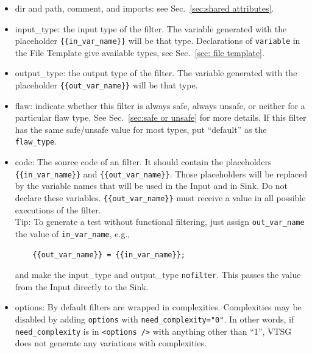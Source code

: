 \documentclass[12pt]{article}
\begin{document}
\begin{itemize}
    \item dir and path, comment, and imports: see Sec.~\ref{sec:shared attributes}.

    \item input\_type: the input type of the filter. The variable 
    generated with
    the placeholder \verb|{{in_var_name}}| will be that type.
    Declarations of \verb|variable| in the File Template give
    available types, see Sec.~\ref{sec: file template}.

    \item output\_type: the output type of the filter.  The variable generated
    with the placeholder \verb|{{out_var_name}}| will be that type.

    \item flaw: indicate whether this filter is always safe, always unsafe, or
      neither for a particular flaw type.  See Sec.~\ref{sec:safe or unsafe} for
      more details.  If this filter has the same safe/unsafe value for most
      types, put ``default'' as the \verb|flaw_type|.

    \item code: The source code of an filter. It should contain the placeholders
    \\
    \verb|{{in_var_name}}| and \verb|{{out_var_name}}|.  Those placeholders will 
    be replaced by the variable names that will be used in the Input and in Sink.  Do
    not declare these variables.
    \verb|{{out_var_name}}| must receive a value in all possible executions of the
    filter.
    \\
    Tip: To generate a test without functional filtering, just assign
    \verb|out_var_name| the value of \verb|in_var_name|, e.g.,
\begin{verbatim}
    {{out_var_name}} = {{in_var_name}};
\end{verbatim}
    and make the input\_type and output\_type \verb|nofilter|.
    This passes the value from the Input directly to the Sink.

    \item options: By default filters are wrapped in complexities.  Complexities may
      be disabled by adding \verb|options| with \verb|need_complexity="0"|.
      In other words, if \linebreak[4] \verb|need_complexity| is in
      \verb|<options />| with anything other than ``1'', VTSG does not generate any
      variations with complexities.
\end{itemize}
\end{document}
